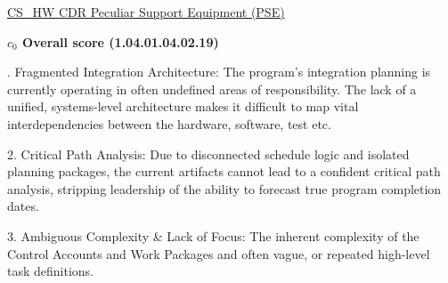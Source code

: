 % 


\begin{frame}{\href{run:../local/source-docs/1.04.01.04.02.19.pdf}{CS\_HW CDR Peculiar Support Equipment (PSE)}}
\centering
{}
\par
\vspace{0.75em}
\textbf{\small{\(c_0\) Overall score {\tiny (1.04.01.04.02.19)}}}\\\par
\vspace{0.5em}
\begin{minipage}{0.85\textwidth}
\raggedright
\fontsize{7}{9}. Fragmented Integration Architecture: The program's integration planning is currently operating in often undefined areas of responsibility. The lack of a unified, systems-level architecture makes it difficult to map vital interdependencies between the hardware, software, test etc.\par\vspace{0.5em}2. Critical Path Analysis: Due to disconnected schedule logic and isolated planning packages, the current artifacts cannot lead to a confident critical path analysis, stripping leadership of the ability to forecast true program completion dates.\par\vspace{0.5em}3. Ambiguous Complexity \& Lack of Focus: The inherent complexity of the Control Accounts and Work Packages and often vague, or repeated high-level task definitions.\par
\end{minipage}
\end{frame}
